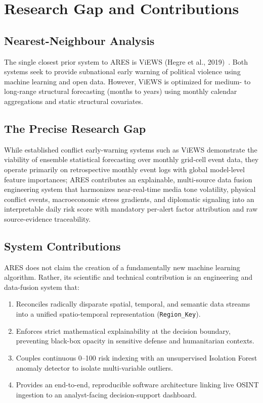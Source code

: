 \documentclass[preprint,12pt]{elsarticle}
\begin{document}
\section{Research Gap and Contributions}
\label{sec:gaps}

\subsection{Nearest-Neighbour Analysis}
The single closest prior system to ARES is ViEWS (Hegre et al., 2019)~\cite{hegre2019views}. Both systems seek to provide subnational early warning of political violence using machine learning and open data. However, ViEWS is optimized for medium- to long-range structural forecasting (months to years) using monthly calendar aggregations and static structural covariates.

\subsection{The Precise Research Gap}
While established conflict early-warning systems such as ViEWS demonstrate the viability of ensemble statistical forecasting over monthly grid-cell event data, they operate primarily on retrospective monthly event logs with global model-level feature importances; ARES contributes an explainable, multi-source data fusion engineering system that harmonizes near-real-time media tone volatility, physical conflict events, macroeconomic stress gradients, and diplomatic signaling into an interpretable daily risk score with mandatory per-alert factor attribution and raw source-evidence traceability.

\subsection{System Contributions}
ARES does not claim the creation of a fundamentally new machine learning algorithm. Rather, its scientific and technical contribution is an engineering and data-fusion system that:
\begin{enumerate}
    \item Reconciles radically disparate spatial, temporal, and semantic data streams into a unified spatio-temporal representation (\texttt{Region\_Key}).
    \item Enforces strict mathematical explainability at the decision boundary, preventing black-box opacity in sensitive defense and humanitarian contexts.
    \item Couples continuous 0--100 risk indexing with an unsupervised Isolation Forest anomaly detector to isolate multi-variable outliers.
    \item Provides an end-to-end, reproducible software architecture linking live OSINT ingestion to an analyst-facing decision-support dashboard.
\end{enumerate}
\end{document}
